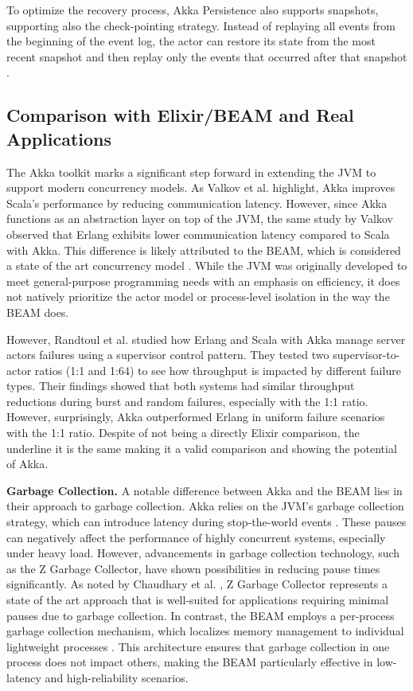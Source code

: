 To optimize the recovery process, Akka Persistence also supports snapshots, supporting also the check-pointing strategy. Instead of replaying all events from the beginning of the event log, the actor can restore its state from the most recent snapshot and then replay only the events that occurred after that snapshot \cite{Abraham2023,akka-docs}.

\subsection{Comparison with Elixir/BEAM and Real Applications}

The Akka toolkit marks a significant step forward in extending the \gls{JVM} to support modern concurrency models. As Valkov et al. \cite{Valkov2018} highlight, Akka improves Scala’s performance by reducing communication latency. However, since Akka functions as an abstraction layer on top of the \gls{JVM}, the same study by Valkov observed that Erlang exhibits lower communication latency compared to Scala with Akka. This difference is likely attributed to the \gls{BEAM}, which is considered a state of the art concurrency model \cite{erlang-concurrency-blog}. While the \gls{JVM} was originally developed to meet general-purpose programming needs with an emphasis on efficiency, it does not natively prioritize the actor model or process-level isolation in the way the \gls{BEAM} does.

However, Randtoul et al. \cite{Randtoul2022} studied how Erlang and Scala with Akka manage server actors failures using a supervisor control pattern. They tested two supervisor-to-actor ratios (1:1 and 1:64) to see how throughput is impacted by different failure types. Their findings showed that both systems had similar throughput reductions during burst and random failures, especially with the 1:1 ratio. However, surprisingly, Akka outperformed Erlang in uniform failure scenarios with the 1:1 ratio. Despite of not being a directly Elixir comparison, the underline it is the same making it a valid comparison and showing the potential of Akka.

\textbf{Garbage Collection.} A notable difference between Akka and the \gls{BEAM} lies in their approach to garbage collection. Akka relies on the \gls{JVM}’s garbage collection strategy, which can introduce latency during stop-the-world events \cite{akka-docs,Abraham2023}. These pauses can negatively affect the performance of highly concurrent systems, especially under heavy load. However, advancements in garbage collection technology, such as the Z Garbage Collector, have shown possibilities in reducing pause times significantly. As noted by Chaudhary et al. \cite{Chaudhary2024}, Z Garbage Collector represents a state of the art approach that is well-suited for applications requiring minimal pauses due to garbage collection. In contrast, the \gls{BEAM} employs a per-process garbage collection mechanism, which localizes memory management to individual lightweight processes \cite{Juric2024}. This architecture ensures that garbage collection in one process does not impact others, making the \gls{BEAM} particularly effective in low-latency and high-reliability scenarios.

